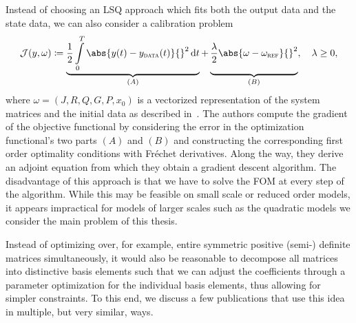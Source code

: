 Instead of choosing an \ac{LSQ} approach which fits both the output data and the state data, we can also consider a calibration problem
\begin{equation}\label{eq:günther-calibration-objective}
    \mcl{J}(y, \omega) \coloneqq \underbrace{\frac{1}{2} \int\limits_0^T \abs{y(t) - y_\msc{data}(t)}{}^2 \dif t}_{(A)} + \underbrace{\vphantom{\int\limits_0^T}\frac{\lambda}{2} \abs{\omega - \omega_\msc{ref}}{}^2}_{(B)}, \quad \lambda \geq 0,
\end{equation}
where $\omega = (J, R, Q, G, P, x_0)$ is a vectorized representation of the system matrices and the initial data as described in~\cite{Günther2023}.
The authors compute the gradient of the objective functional by considering the error in the optimization functional's two parts $(A)$ and $(B)$ and constructing the corresponding first order optimality conditions with Fréchet derivatives.
Along the way, they derive an adjoint equation from which they obtain a gradient descent algorithm.
The disadvantage of this approach is that we have to solve the \ac{FOM} at every step of the algorithm.
While this may be feasible on small scale or reduced order models, it appears impractical for models of larger scales such as the quadratic models we consider the main problem of this thesis.

Instead of optimizing over, for example, entire symmetric positive (semi-) definite matrices simultaneously, it would also be reasonable to decompose all matrices into distinctive basis elements such that we can adjust the coefficients through a parameter optimization for the individual basis elements, thus allowing for simpler constraints.
To this end, we discuss a few publications that use this idea in multiple, but very similar, ways.

